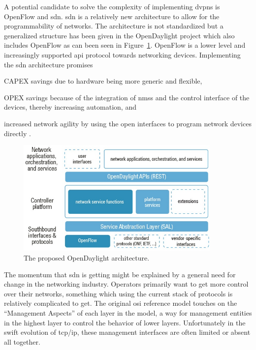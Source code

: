 A potential candidate to solve the complexity of implementing \acp{dvpn} is OpenFlow \cite{openflow} and \ac{sdn}. \ac{sdn} is a relatively new architecture to allow for the programmability of networks. The architecture is not standardized but a generalized structure has been given in the OpenDaylight project \cite{opendaylight} which also includes OpenFlow as can been seen in Figure~\ref{fig:opendaylight}. OpenFlow is a lower level and increasingly supported \ac{api} protocol towards networking devices. Implementing the \ac{sdn} architecture promises
\begin{inparaenum}
	\item CAPEX savings due to hardware being more generic and flexible,
	\item OPEX savings because of the integration of \acp{nms} and the control interface of the devices, thereby increasing automation, and
	\item increased network agility by using the open interfaces to program network devices directly \cite{packet-circuit}.
	\end{inparaenum} 

\begin{figure}[!h]
	\centering
	\includegraphics[width=10cm]{./includes/opendaylight.jpg}
	\caption{The proposed OpenDaylight architecture.}
	\label{fig:opendaylight}
\end{figure}
	
The momentum that \ac{sdn} is getting might be explained by a general need for change in the networking industry. Operators primarily want to get more control over their networks, something which using the current stack of protocols is relatively complicated to get. The original \acs{osi} reference model \cite{zimmermann} touches on the ``Management Aspects'' of each layer in the model, a way for management entities in the highest layer to control the behavior of lower layers. Unfortunately in the swift evolution of \ac{tcp}/\ac{ip}, these management interfaces are often limited or absent all together. 



